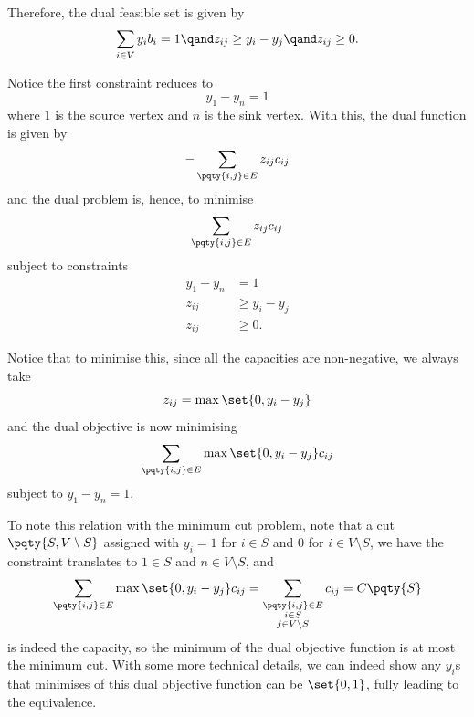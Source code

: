 Therefore, the dual feasible set is given by
\[
    \sum_{i \in V} y_i b_i = 1 \qand z_{ij} \geq y_i - y_j \qand z_{ij} \geq 0.
\]

Notice the first constraint reduces to
\[
    y_1 - y_n = 1
\]
where \(1\) is the source vertex and \(n\) is the sink vertex. With this, the dual function is given by
\[
    -\sum_{\pqty{i, j} \in E} z_{ij} c_{ij}
\]
and the dual problem is, hence, to minimise
\[
    \sum_{\pqty{i, j} \in E} z_{ij} c_{ij}
\]
subject to constraints
\begin{align*}
    y_1 - y_n &= 1 \\
    z_{ij} &\geq y_i - y_j \\
    z_{ij} &\geq 0.
\end{align*}

Notice that to minimise this, since all the capacities are non-negative, we always take
\[
    z_{ij} = \max \set{0, y_i - y_j}
\]
and the dual objective is now minimising
\[
    \sum_{\pqty{i, j} \in E} \max \set{0, y_i - y_j} c_{ij}
\]
subject to \(y_1 - y_n = 1\).

To note this relation with the minimum cut problem, note that a cut \(\pqty{S, V \setminus S}\) assigned with \(y_i = 1\) for \(i \in S\) and \(0\) for \(i \in V \setminus S\), we have the constraint translates to \(1 \in S\) and \(n \in V \setminus S\), and
\[
    \sum_{\pqty{i, j} \in E} \max \set{0, y_i - y_j} c_{ij} = \sum_{\substack{\pqty{i, j} \in E \\ i \in S \\ j \in V \setminus S}} c_{ij} = C\pqty{S}
\]
is indeed the capacity, so the minimum of the dual objective function is at most the minimum cut. With some more technical details, we can indeed show any \(y_i\)s that minimises of this dual objective function can be \(\set{0, 1}\), fully leading to the equivalence.